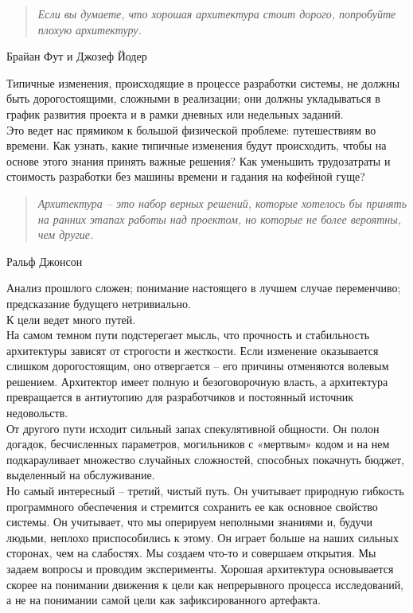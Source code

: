 \documentclass[a4paper, 12pt]{report}
\begin{document}
{    \begin{quote}
        \textit{Если вы думаете, что хорошая архитектура стоит дорого, попробуйте плохую архитектуру.}
    \end{quote}
    \begin{flushright}
        Брайан Фут и Джозеф Йодер
    \end{flushright}
    Типичные изменения, происходящие в процессе разработки системы, не должны быть дорогостоящими, сложными в реализации; они должны укладываться в график развития проекта и в рамки дневных или недельных заданий.\\
    Это ведет нас прямиком к большой физической проблеме: путешествиям во времени. Как узнать, какие типичные изменения будут происходить, чтобы на основе этого знания принять важные решения? Как уменьшить трудозатраты и стоимость разработки без машины времени и гадания на кофейной гуще?\\
    \begin{quote}
        \textit{Архитектура – это набор верных решений, которые хотелось бы принять на ранних этапах работы над проектом, но которые не более вероятны, чем другие.}
    \end{quote}
    \begin{flushright}
        Ральф Джонсон
    \end{flushright}
    Анализ прошлого сложен; понимание настоящего в лучшем случае переменчиво; предсказание будущего нетривиально.\\
    К цели ведет много путей.\\
    На самом темном пути подстерегает мысль, что прочность и стабильность архитектуры зависят от строгости и жесткости. Если изменение оказывается слишком дорогостоящим, оно отвергается – его причины отменяются волевым решением. Архитектор имеет полную и безоговорочную власть, а архитектура превращается в антиутопию для разработчиков и постоянный источник недовольств.\\
    От другого пути исходит сильный запах спекулятивной общности. Он полон догадок, бесчисленных параметров, могильников с «мертвым» кодом и на нем подкарауливает множество случайных сложностей, способных покачнуть бюджет, выделенный на обслуживание.\\
    Но самый интересный – третий, чистый путь. Он учитывает природную гибкость программного обеспечения и стремится сохранить ее как основное свойство системы. Он учитывает, что мы оперируем неполными знаниями и, будучи людьми, неплохо приспособились к этому. Он играет больше на наших сильных сторонах, чем на слабостях. Мы создаем что-то и совершаем открытия. Мы задаем вопросы и проводим эксперименты. Хорошая архитектура основывается скорее на понимании движения к цели как непрерывного процесса исследований, а не на понимании самой цели как зафиксированного артефакта.\\
}
\end{document}
